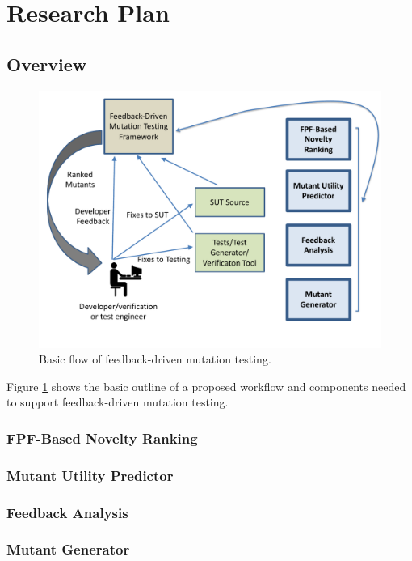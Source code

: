 \section{Research Plan}

\subsection{Overview}

\begin{figure}[t]
\centering
\includegraphics[width=0.8\columnwidth]{TestFlow}

\caption{Basic flow of feedback-driven mutation testing.}
\label{fig:flow}
\end{figure}

Figure \ref{fig:flow} shows the basic outline of a proposed workflow
and components needed to support feedback-driven mutation testing.

\subsubsection{FPF-Based Novelty Ranking}

\subsubsection{Mutant Utility Predictor}

\subsubsection{Feedback Analysis}

\subsubsection{Mutant Generator}

